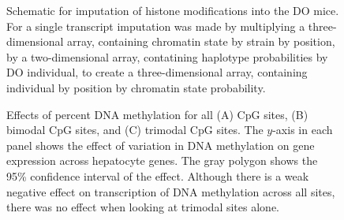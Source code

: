 \documentclass[
  11pt,
]{article}
\begin{document}
\begin{figure}[ht!]
\caption{Schematic for imputation of histone modifications into the 
DO mice. For a single transcript imputation was made by multiplying 
a three-dimensional array, containing chromatin state by strain by
position, by a two-dimensional array, contatining haplotype probabilities
by DO individual, to create a three-dimensional array, containing 
individual by position by chromatin state probability.}
\label{supp_fig:imputation}
\end{figure}

\begin{figure}[ht!]
\caption{Effects of percent DNA methylation for all (A) CpG sites,
(B) bimodal CpG sites, and (C) trimodal CpG sites. The $y$-axis
in each panel shows the effect of variation in DNA methylation on 
gene expression across hepatocyte genes. The gray polygon shows the
95\% confidence interval of the effect. Although there is a weak
negative effect on transcription of DNA methylation across all 
sites, there was no effect when looking at trimodal sites alone.}
\label{supp_fig:trimodal}
\end{figure}

\pagebreak


\end{document}
